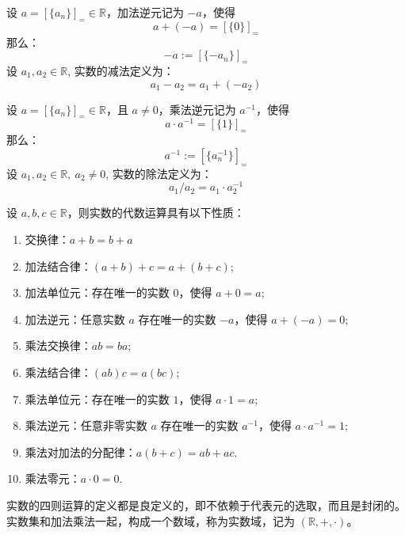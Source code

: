 \vspace{1em}

\begin{definition}[实数加法逆元与减法]
    设 $a=[\{a_n\}]_{=}\in\mathbb{R}$，加法逆元记为 $-a$，使得
    \[
        a + (-a) = [\{0\}]_{=}
    \]
    那么：
    \[
        -a:= [\{-a_n\}]_{=}
    \]
    设 $a_1,a_2\in\mathbb{R}$, 实数的减法定义为：
    \[
        a_1 - a_2 = a_1 + (-a_2)
    \]
\end{definition}

\begin{definition}[实数乘法逆元与除法]
    设 $a=[\{a_n\}]_{=}\in\mathbb{R}$，且 $a\neq 0$，乘法逆元记为 $a^{-1}$，使得
    \[
        a \cdot a^{-1} = [\{1\}]_{=}
    \]
    那么：
    \[
        a^{-1} := [\{a_n^{-1}\}]_{=}
    \]
    设 $a_1,a_2\in\mathbb{R},\ a_2\neq 0$, 实数的除法定义为：
    \[
        a_1 / a_2 = a_1 \cdot a_2^{-1}
    \]
\end{definition}
\vspace{1em}

\begin{proposition}[实数代数运算的性质]
    设 $a,b,c\in\mathbb{R}$，则实数的代数运算具有以下性质：
    \begin{enumerate}
        \item 交换律：$a+b=b+a$
        \item 加法结合律：$(a+b)+c=a+(b+c)$;
        \item 加法单位元：存在唯一的实数 $0$，使得 $a+0=a$;
        \item 加法逆元：任意实数 $a$ 存在唯一的实数 $-a$，使得 $a+(-a)=0$;
        \item 乘法交换律：$ab=ba$;
        \item 乘法结合律：$(ab)c=a(bc)$;
        \item 乘法单位元：存在唯一的实数 $1$，使得 $a\cdot 1=a$;
        \item 乘法逆元：任意非零实数 $a$ 存在唯一的实数 $a^{-1}$，使得 $a\cdot a^{-1}=1$;
        \item 乘法对加法的分配律：$a(b+c)=ab+ac$.
        \item 乘法零元：$a\cdot 0 = 0$.
    \end{enumerate}
\end{proposition}

\begin{note}
    实数的四则运算的定义都是良定义的，即不依赖于代表元的选取，而且是封闭的。实数集和加法乘法一起，构成一个数域，称为实数域，记为 $(\mathbb{R},+,\cdot)$。
\end{note}

